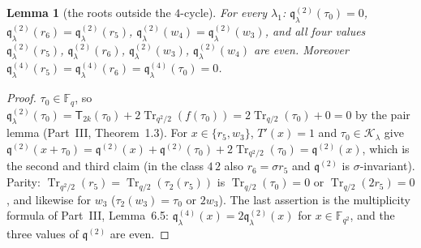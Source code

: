 \documentclass[12pt,a4paper]{amsart}
\newtheorem{lemma}[theorem]{Lemma}
\theoremstyle{definition}
\newcommand{\F}{\mathbb{F}}
\newcommand{\Tr}{\operatorname{Tr}}
\newcommand{\Kk}{\mathcal{K}}
\newcommand{\qq}{\mathfrak{q}}
\newcommand{\Tw}{\mathsf{T}}
\begin{document}
\begin{lemma}[the roots outside the $4$-cycle]\label{lem:r5}
For every $\lambda_1$: $\qq^{(2)}_\lambda(\tau_0)=0$, $\qq^{(2)}_\lambda(r_6)=\qq^{(2)}_\lambda(r_5)$, $\qq^{(2)}_\lambda(w_4)=\qq^{(2)}_\lambda(w_3)$, and all four values $\qq^{(2)}_\lambda(r_5)$, $\qq^{(2)}_\lambda(r_6)$, $\qq^{(2)}_\lambda(w_3)$, $\qq^{(2)}_\lambda(w_4)$ are even. Moreover $\qq^{(4)}_\lambda(r_5)=\qq^{(4)}_\lambda(r_6)=\qq^{(4)}_\lambda(\tau_0)=0$.
\end{lemma}
\begin{proof}
$\tau_0\in\F_q$, so $\qq^{(2)}_\lambda(\tau_0)=\Tw_{2k}(\tau_0)+2\Tr_{q^2/2}(f(\tau_0))=2\Tr_{q/2}(\tau_0)+0=0$ by the pair lemma (Part~III, Theorem~1.3). For $x\in\{r_5,w_3\}$, $T'(x)=1$ and $\tau_0\in\Kk_\lambda$ give $\qq^{(2)}(x+\tau_0)=\qq^{(2)}(x)+\qq^{(2)}(\tau_0)+2\Tr_{q^2/2}(\tau_0)=\qq^{(2)}(x)$, which is the second and third claim (in the class $4\,2$ also $r_6=\sigma r_5$ and $\qq^{(2)}$ is $\sigma$-invariant). Parity: $\Tr_{q^2/2}(r_5)=\Tr_{q/2}(\tau_2(r_5))$ is $\Tr_{q/2}(\tau_0)=0$ or $\Tr_{q/2}(2r_5)=0$, and likewise for $w_3$ ($\tau_2(w_3)=\tau_0$ or $2w_3$). The last assertion is the multiplicity formula of Part~III, Lemma~6.5: $\qq^{(4)}_\lambda(x)=2\qq^{(2)}_\lambda(x)$ for $x\in\F_{q^2}$, and the three values of $\qq^{(2)}$ are even.
\end{proof}
\end{document}
